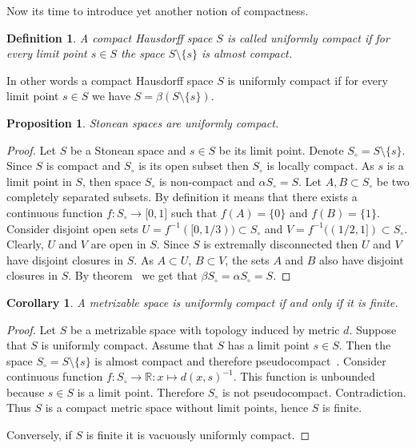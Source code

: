 \documentclass[12pt]{article}
\newtheorem{proposition}[theorem]{Proposition}
\newtheorem{corollary}[theorem]{Corollary}
\newtheorem{definition}[theorem]{Definition}
\begin{document}
Now its time to introduce yet another notion of compactness.

\begin{definition} A compact Hausdorff space $S$ is called uniformly compact if
    for every limit point $s\in S$ the space $S\setminus \{s\}$ is almost
    compact.
\end{definition}

In other words a compact Hausdorff space $S$ is uniformly compact if for every
limit point $s\in S$ we have $S=\beta(S\setminus \{s\})$.

\begin{proposition}\label{StoneSpUnifComp} Stonean spaces are uniformly compact.
\end{proposition}
\begin{proof} Let $S$ be a Stonean space and $s\in S$ be its limit point. Denote
    $S_\circ=S\setminus \{s\}$. Since $S$ is compact and $S_\circ$ is its open
    subset then $S_\circ$ is locally compact. As $s$ is a limit point in $S$,
    then space $S_\circ$ is non-compact and $\alpha S_\circ=S$. 
    Let $A,B\subset S_\circ$ be two completely separated subsets. 
    By definition it means that there exists a continuous 
    function $f:S_\circ\to\mathbb[0,1]$ such that
    $f(A)=\{0\}$ and $f(B)=\{1\}$. Consider disjoint open sets
    $U=f^{-1}([0,1/3))\subset S_\circ$ and  %
    $V=f^{-1}((1/2,1])\subset S_\circ$.  %
    Clearly, $U$ and $V$ are open in $S$. Since $S$ is extremally disconnected
    then $U$ and $V$ have disjoint closures in $S$. As $A\subset U$, $B\subset
        V$, the sets $A$ and $B$ also have disjoint closures in $S$. By
    theorem~\cite[theorem 3.6.2]{EngkingGenTop} we get that $\beta
        S_\circ=\alpha S_\circ=S$.
\end{proof}

\begin{corollary}\label{MesSpUnifCompIffFin} A metrizable space is uniformly
    compact if and only if it is finite.
\end{corollary}
\begin{proof} Let $S$ be a metrizable space with topology induced by metric $d$.
    Suppose that $S$ is uniformly compact. Assume that $S$ has a limit point
    $s\in S$. Then the space $S_\circ=S\setminus \{s\}$ is almost compact and
    therefore pseudocompact~\cite[proposition 1.3.10]{HrusPsdCompTopSp}.
    Consider continuous function $f:S_\circ\to\mathbb{R}:x\mapsto
        {d(x,s)}^{-1}$. This function is unbounded because $s\in S$ is a limit
    point. Therefore $S_\circ$ is not pseudocompact. Contradiction. Thus $S$ is
    a compact metric space without limit points, hence $S$ is finite.

    Conversely, if $S$ is finite it is vacuously uniformly compact.
\end{proof}
\end{document}
